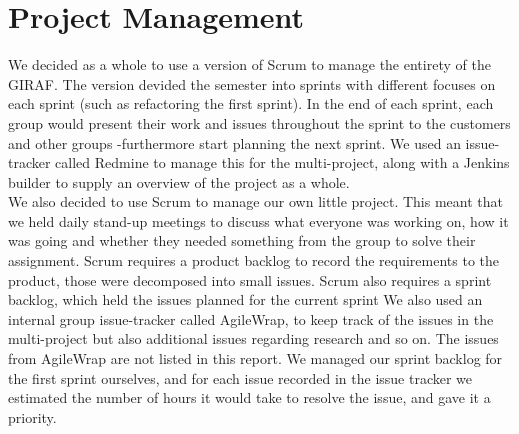 \section{Project Management}\label{spr1_projmana}
We decided as a whole to use a version of Scrum to manage the entirety of the GIRAF. The version devided the semester into sprints with different focuses on each sprint (such as refactoring the first sprint). In the end of each sprint, each group would present their work and issues throughout the sprint to the customers and other groups -furthermore start planning the next sprint. We used an issue-tracker called Redmine to manage this for the multi-project, along with a Jenkins builder to supply an overview of the project as a whole. \\
We also decided to use Scrum to manage our own little project. This meant that we held daily stand-up meetings to discuss what everyone was working on, how it was going and whether they needed something from the group to solve their assignment. Scrum requires a product backlog to record the requirements to the product, those were decomposed into small issues. Scrum also requires a sprint backlog, which held the issues planned for the current sprint We also used an internal group issue-tracker called AgileWrap, to keep track of the issues in the multi-project but also additional issues regarding research and so on. The issues from AgileWrap are not listed in this report. 
We managed our sprint backlog for the first sprint ourselves, and for each issue recorded in the issue tracker we estimated the number of hours it would take to resolve the issue, and gave it a priority.